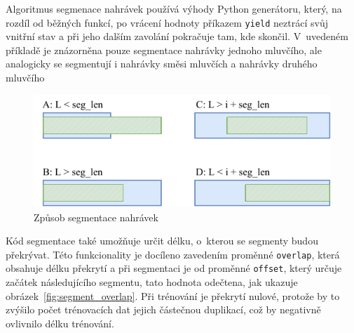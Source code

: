 \bigskip

\begin{algorithm}[H]
 \caption{\label{alg:segmentace_nahravek}Algoritmus segmenace nahrávek používá výhody Python generátoru, který, na rozdíl od běžných funkcí, po vrácení hodnoty příkazem \texttt{yield} neztrácí svůj vnitřní stav a při jeho dalším zavolání pokračuje tam, kde skončil. V~uvedeném příkladě je znázorněna pouze segmentace nahrávky jednoho mluvčího, ale analogicky se segmentují i nahrávky směsi mluvčích a nahrávky druhého mluvčího}

\SetNoFillComment


\end{algorithm}


\begin{figure}[H]
    \centering
    \includegraphics[scale=1.0]{obrazky-figures/segmentation.pdf}
    \caption{\label{fig:generovani_segmentu}Způsob segmentace nahrávek}
\end{figure}


Kód segmentace také umožňuje určit délku, o~kterou se segmenty budou překrývat. Této funkcionality je docíleno zavedením proměnné \texttt{overlap}, která obsahuje délku překrytí a při segmentaci je od proměnné \texttt{offset}, který určuje začátek následujícího segmentu, tato hodnota odečtena, jak ukazuje obrázek~\ref{fig:segment_overlap}. Při trénování je překrytí nulové, protože by to zvýšilo počet trénovacích dat jejich částečnou duplikací, což by negativně ovlivnilo délku trénování.

